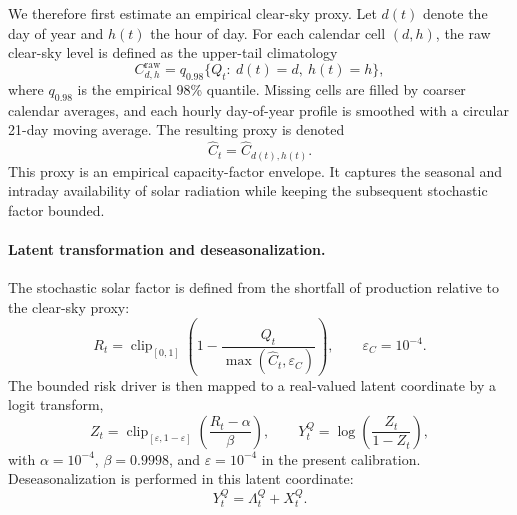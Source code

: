We therefore first estimate an empirical clear-sky proxy. Let \(d(t)\) denote
the day of year and \(h(t)\) the hour of day. For each calendar cell \((d,h)\),
the raw clear-sky level is defined as the upper-tail climatology
\begin{equation}
  C^{\mathrm{raw}}_{d,h}
  =
  q_{0.98}\{Q_t:\ d(t)=d,\ h(t)=h\},
  \label{eq:solar-raw-clearsky}
\end{equation}
where \(q_{0.98}\) is the empirical 98\% quantile. Missing cells are filled by
coarser calendar averages, and each hourly day-of-year profile is smoothed with
a circular 21-day moving average. The resulting proxy is denoted
\begin{equation}
  \widehat C_t = \widehat C_{d(t),h(t)} .
  \label{eq:solar-clearsky-proxy}
\end{equation}
This proxy is an empirical capacity-factor envelope. It captures the seasonal
and intraday availability of solar radiation while keeping the subsequent
stochastic factor bounded.

\paragraph{Latent transformation and deseasonalization.}
The stochastic solar factor is defined from the shortfall of production relative
to the clear-sky proxy:
\begin{equation}
  R_t
  =
  \operatorname{clip}_{[0,1]}
  \left(
    1-\frac{Q_t}{\max(\widehat C_t,\varepsilon_C)}
  \right),
  \qquad
  \varepsilon_C=10^{-4}.
  \label{eq:solar-risk-driver}
\end{equation}
The bounded risk driver is then mapped to a real-valued latent coordinate by a
logit transform,
\begin{equation}
  Z_t
  =
  \operatorname{clip}_{[\varepsilon,1-\varepsilon]}
  \left(
    \frac{R_t-\alpha}{\beta}
  \right),
  \qquad
  Y^Q_t = \log\left(\frac{Z_t}{1-Z_t}\right),
  \label{eq:solar-logit-transform}
\end{equation}
with \(\alpha=10^{-4}\), \(\beta=0.9998\), and \(\varepsilon=10^{-4}\) in the
present calibration. Deseasonalization is performed in this latent coordinate:
\begin{equation}
  Y^Q_t = \Lambda^Q_t + X^Q_t .
  \label{eq:solar-additive-decomposition}
\end{equation}

